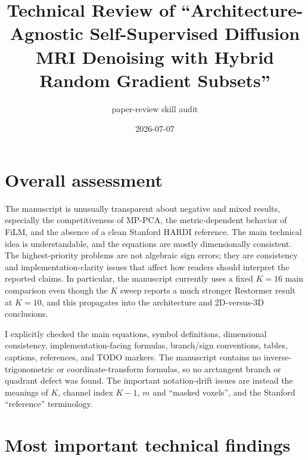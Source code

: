 \documentclass[11pt]{article}
\title{Technical Review of ``Architecture-Agnostic Self-Supervised Diffusion MRI Denoising with Hybrid Random Gradient Subsets''}
\author{paper-review skill audit}
\date{2026-07-07}
\begin{document}
\maketitle

\section*{Overall assessment}

The manuscript is unusually transparent about negative and mixed results, especially the competitiveness of MP-PCA, the metric-dependent behavior of FiLM, and the absence of a clean Stanford HARDI reference. The main technical idea is understandable, and the equations are mostly dimensionally consistent. The highest-priority problems are not algebraic sign errors; they are consistency and implementation-clarity issues that affect how readers should interpret the reported claims. In particular, the manuscript currently uses a fixed $K=16$ main comparison even though the $K$ sweep reports a much stronger Restormer result at $K=10$, and this propagates into the architecture and 2D-versus-3D conclusions.

I explicitly checked the main equations, symbol definitions, dimensional consistency, implementation-facing formulas, branch/sign conventions, tables, captions, references, and TODO markers. The manuscript contains no inverse-trigonometric or coordinate-transform formulas, so no arctangent branch or quadrant defect was found. The important notation-drift issues are instead the meanings of $K$, channel index $K-1$, $m$ and ``masked voxels'', and the Stanford ``reference'' terminology.

\section*{Most important technical findings}
\end{document}
